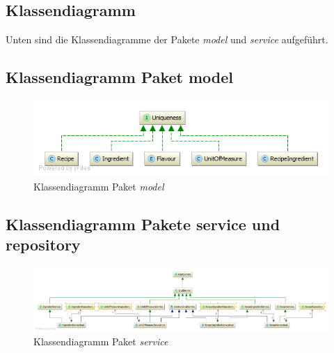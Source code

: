 \subsection{Klassendiagramm}
Unten sind die Klassendiagramme der Pakete \emph{model} und \emph{service} aufgeführt.

\subsection{Klassendiagramm Paket model}

\begin{figure}[h]
\centering
\includegraphics[width=0.6\columnwidth]{graphics/Klassendiagramm_model.png}%
	\caption{Klassendiagramm Paket \emph{model}}
	\label{fig:Klassendiagramm_model}
\end{figure}

\subsection{Klassendiagramm Pakete service und repository}
\begin{figure}[h]
\centering
\includegraphics[width=1\columnwidth]{graphics/Klassendiagramm_service_repository.png}%
	\caption{Klassendiagramm Paket \emph{service}}
	\label{fig:Klassendiagramm_service_repository}
\end{figure}



